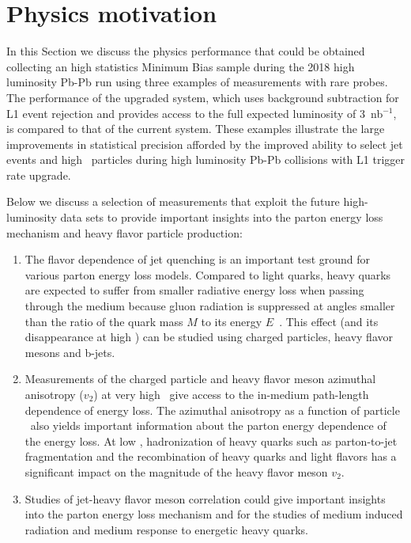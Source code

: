 \section{Physics motivation\label{sec:physHI}}
\label{sec:physics}

In this Section we discuss the physics performance that could be obtained collecting an high statistics Minimum Bias sample during the 2018 high luminosity Pb-Pb run using three examples of measurements with rare probes. The performance of the upgraded system, which uses background subtraction for L1 event rejection and provides access to the full expected luminosity of 3~nb$^{-1}$, is compared to that of the current system. These examples illustrate the large improvements in statistical precision afforded by the improved ability to select jet events and high \pt\ particles during high luminosity Pb-Pb collisions with L1 trigger rate upgrade. 

Below we discuss a selection of measurements that exploit the future high-luminosity data sets to provide important insights into the parton energy loss mechanism and heavy flavor particle production:

\begin{enumerate}
\item The flavor dependence of jet quenching is an important test ground for various parton energy loss models. 
Compared to light quarks, heavy quarks are expected to suffer from smaller radiative energy loss when passing through the medium because gluon radiation is suppressed at angles smaller than the ratio of the quark mass $M$ to its energy $E$~\cite{Dokshitzer:2001zm}. This effect (and its disappearance at high \pt) can be studied using charged particles, heavy flavor mesons and b-jets.
\item Measurements of the charged particle and heavy flavor meson azimuthal anisotropy ($v_2$) at very high \pt\ give access to the in-medium path-length 
dependence of energy loss. The azimuthal anisotropy as a function of particle \pt\ also yields important information about the parton energy dependence of the energy loss.  At low \pt, hadronization of heavy quarks such as parton-to-jet fragmentation and the recombination of heavy quarks and light flavors has a significant impact on the magnitude of the heavy flavor meson $v_2$. 
\item Studies of jet-heavy flavor meson correlation could give important insights into the parton energy loss mechanism and for the studies of medium induced radiation and medium response to energetic heavy quarks.
\end{enumerate}

